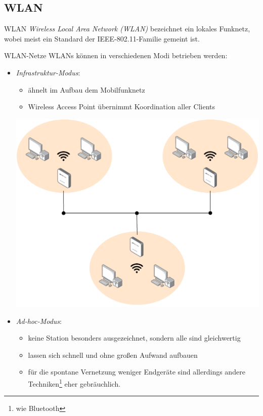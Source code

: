 \subsection{WLAN}

\begin{defi}{WLAN}
    \emph{Wireless Local Area Network (WLAN)} bezeichnet ein lokales Funknetz, wobei meist ein Standard der IEEE-802.11-Familie gemeint ist.
\end{defi}

\begin{defi}{WLAN-Netze}
    WLANs können in verschiedenen Modi betrieben werden:
    \begin{itemize}
        \item \emph{Infrastruktur-Modus}:
              \begin{itemize}
                  \item ähnelt im Aufbau dem Mobilfunknetz
                  \item Wireless Access Point übernimmt Koordination aller Clients
              \end{itemize}
              \begin{center}
                  \vspace{1em}
                  \includegraphics[width=.6\textwidth]{includes/figures/defi_wlan.pdf}
              \end{center}
        \item \emph{Ad-hoc-Modus}:
              \begin{itemize}
                  \item keine Station besonders ausgezeichnet, sondern alle sind gleichwertig
                  \item lassen sich schnell und ohne großen Aufwand aufbauen
                  \item für die spontane Vernetzung weniger Endgeräte sind allerdings andere Techniken\footnote{wie Bluetooth} eher gebräuchlich.

\end{itemize}
\end{itemize}
\end{defi}
